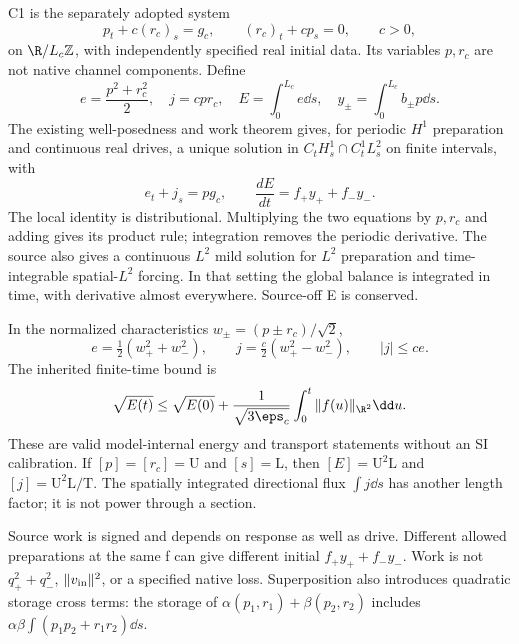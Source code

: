 C1 is the separately adopted system
\begin{equation}\label{eq:C1}
 p_t+c(r_c)_s=g_c,\qquad (r_c)_t+c p_s=0,\qquad c>0,
\end{equation}
on $\R/L_c\mathbb Z$, with independently specified real initial data. Its variables $p,r_c$ are not native channel components. Define
\begin{equation}\label{eq:storage}
 e=\frac{p^2+r_c^2}{2},\quad j=cpr_c,\quad E=\int_0^{L_c}e\dd s,
 \quad y_\pm=\int_0^{L_c}b_\pm p\dd s.
\end{equation}
The existing well-posedness and work theorem \cite[carrier section]{pairedII} gives, for periodic $H^1$ preparation and continuous real drives, a unique solution in
$C_tH^1_s\cap C_t^1L^2_s$ on finite intervals, with
\begin{equation}\label{eq:work}
 \boxed{e_t+j_s=pg_c,\qquad \frac{dE}{dt}=f_+y_++f_-y_-.}
\end{equation}
The local identity is distributional. Multiplying the two equations by $p,r_c$ and adding gives its product rule; integration removes the periodic derivative. The source also gives a continuous $L^2$ mild solution for $L^2$ preparation and time-integrable spatial-$L^2$ forcing. In that setting the global balance is integrated in time, with derivative almost everywhere. Source-off E is conserved.

In the normalized characteristics $w_\pm=(p\pm r_c)/\sqrt2$,
\begin{equation}\label{eq:characteristic}
 e=\tfrac12(w_+^2+w_-^2),\qquad
 j=\tfrac c2(w_+^2-w_-^2),\qquad |j|\le ce.
\end{equation}
The inherited finite-time bound is
\begin{equation}\label{eq:energybound}
 \sqrt{E(t)}\le\sqrt{E(0)}+\frac1{\sqrt{3\eps_c}}
                   \int_0^t\|f(u)\|_{\R^2}\dd u.
\end{equation}
These are valid model-internal energy and transport statements without an SI calibration. If $[p]=[r_c]=\mathrm U$ and $[s]=\mathrm L$, then $[E]=\mathrm U^2\mathrm L$ and $[j]=\mathrm U^2\mathrm L/\mathrm T$. The spatially integrated directional flux $\int j\dd s$ has another length factor; it is not power through a section.

Source work is signed and depends on response as well as drive. Different allowed preparations at the same f can give different initial $f_+y_++f_-y_-$. Work is not $q_+^2+q_-^2$, $\|v_{\rm in}\|^2$, or a specified native loss. Superposition also introduces quadratic storage cross terms: the storage of $\alpha(p_1,r_1)+\beta(p_2,r_2)$ includes $\alpha\beta\int(p_1p_2+r_1r_2)\dd s$.

